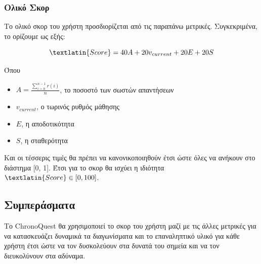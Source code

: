 \subsubsection{Ολικό Σκορ}
Το ολικό σκορ του χρήστη προσδιορίζεται από τις παραπάνω μετρικές. Συγκεκριμένα, το ορίζουμε ως εξής:

$$
    \textlatin{Score} = 40A + 20v_{current} + 20E + 20S
$$

Όπου
\begin{itemize}
    \item $A = \frac{\sum_{i=0}^{n-1}r(i)}{n}$, το ποσοστό των σωστών απαντήσεων
    \item $v_{current}$, ο τωρινός ρυθμός μάθησης
    \item $E$, η αποδοτικότητα
    \item $S$, η σταθερότητα
\end{itemize}

Και οι τέσσερις τιμές θα πρέπει να κανονικοποιηθούν έτσι ώστε όλες να ανήκουν στο διάστημα [0, 1]. Έτσι για το σκορ θα ισχύει η ιδιότητα $\textlatin{Score} \in [0, 100]$.

\subsection{Συμπεράσματα}
Το \textlatin{ChronoQuest} θα χρησιμοποιεί το σκορ του χρήστη μαζί με τις άλλες μετρικές για να κατασκευάζει δυναμικά τα διαγωνίσματα και το επαναληπτικό υλικό για κάθε χρήστη έτσι ώστε να τον δυσκολεύουν στα δυνατά του σημεία και να τον διευκολύνουν στα αδύναμα.